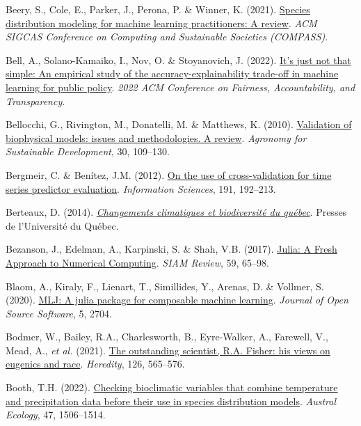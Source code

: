 \documentclass[
  letterpaper,
]{scrbook}
\newlength{\cslhangindent}
\newenvironment{CSLReferences}[2] %
 {\begin{list}{}{%
  \setlength{\itemindent}{0pt}
  \setlength{\leftmargin}{0pt}
  \setlength{\parsep}{0pt}
  \ifodd #1
   \setlength{\leftmargin}{\cslhangindent}
   \setlength{\itemindent}{-1\cslhangindent}
  \fi
  \setlength{\itemsep}{#2\baselineskip}}}
 {\end{list}}
\begin{document}
\begin{CSLReferences}{1}{0}
Beery, S., Cole, E., Parker, J., Perona, P. \& Winner, K. (2021).
\href{https://doi.org/10.1145/3460112.3471966}{Species distribution
modeling for machine learning practitioners: A review}. \emph{ACM SIGCAS
Conference on Computing and Sustainable Societies (COMPASS)}.

Bell, A., Solano-Kamaiko, I., Nov, O. \& Stoyanovich, J. (2022).
\href{https://doi.org/10.1145/3531146.3533090}{It{'}s just not that
simple: An empirical study of the accuracy-explainability trade-off in
machine learning for public policy}. \emph{2022 ACM Conference on
Fairness, Accountability, and Transparency}.

Bellocchi, G., Rivington, M., Donatelli, M. \& Matthews, K. (2010).
\href{https://doi.org/10.1051/agro/2009001}{Validation of biophysical
models: issues and methodologies. A review}. \emph{Agronomy for
Sustainable Development}, 30, 109--130.

Bergmeir, C. \& Benítez, J.M. (2012).
\href{https://doi.org/10.1016/j.ins.2011.12.028}{On the use of
cross-validation for time series predictor evaluation}.
\emph{Information Sciences}, 191, 192--213.

Berteaux, D. (2014).
\emph{\href{https://doi.org/10.1353/book35753}{Changements climatiques
et biodiversité du québec}}. Presses de l'Université du Québec.

Bezanson, J., Edelman, A., Karpinski, S. \& Shah, V.B. (2017).
\href{https://doi.org/10.1137/141000671}{Julia: A Fresh Approach to
Numerical Computing}. \emph{SIAM Review}, 59, 65--98.

Blaom, A., Kiraly, F., Lienart, T., Simillides, Y., Arenas, D. \&
Vollmer, S. (2020). \href{https://doi.org/10.21105/joss.02704}{MLJ: A
julia package for composable machine learning}. \emph{Journal of Open
Source Software}, 5, 2704.

Bodmer, W., Bailey, R.A., Charlesworth, B., Eyre-Walker, A., Farewell,
V., Mead, A., \emph{et al.} (2021).
\href{https://doi.org/10.1038/s41437-020-00394-6}{The outstanding
scientist, R.A. Fisher: his views on eugenics and race}.
\emph{Heredity}, 126, 565--576.

Booth, T.H. (2022). \href{https://doi.org/10.1111/aec.13234}{Checking
bioclimatic variables that combine temperature and precipitation data
before their use in species distribution models}. \emph{Austral
Ecology}, 47, 1506--1514.


\end{CSLReferences}
\end{document}
